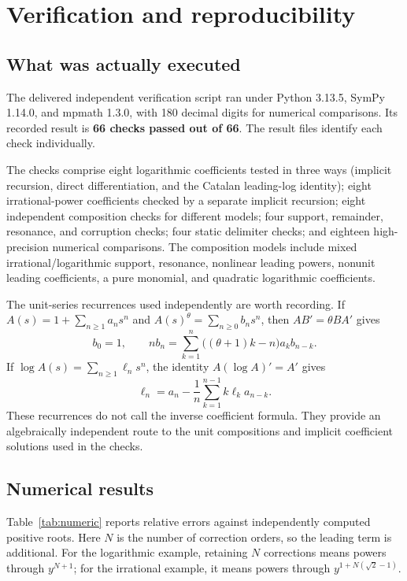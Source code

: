 \documentclass[11pt,a4paper]{article}
\numberwithin{equation}{section}
\theoremstyle{definition}
\begin{document}
\section{Verification and reproducibility}\label{sec:verification}

\subsection{What was actually executed}
The delivered independent verification script ran under Python 3.13.5,
SymPy 1.14.0, and mpmath 1.3.0, with 180 decimal digits for numerical
comparisons. Its recorded result is \textbf{66 checks passed out of 66}.
The result files identify each check individually.

The checks comprise eight logarithmic coefficients tested in three ways
(implicit recursion, direct differentiation, and the Catalan leading-log
identity); eight irrational-power coefficients checked by a separate
implicit recursion; eight independent composition checks for different
models; four support, remainder, resonance, and corruption checks; four
static delimiter checks; and eighteen high-precision numerical comparisons.
The composition models include mixed irrational/logarithmic support,
resonance, nonlinear leading powers, nonunit leading coefficients,
a pure monomial, and quadratic logarithmic coefficients.

The unit-series recurrences used independently are worth recording. If
$A(s)=1+\sum_{n\ge1}a_ns^n$ and $A(s)^\theta=\sum_{n\ge0}b_ns^n$, then
$A B'=\theta B A'$ gives
\begin{equation}\label{eq:unit-power-recurrence}
 b_0=1,\qquad
 nb_n=\sum_{k=1}^{n}\bigl((\theta+1)k-n\bigr)a_kb_{n-k}.
\end{equation}
If $\log A(s)=\sum_{n\ge1}\ell_ns^n$, the identity
$A(\log A)'=A'$ gives
\begin{equation}\label{eq:unit-log-recurrence}
 \ell_n=a_n-\frac1n\sum_{k=1}^{n-1}k\ell_k a_{n-k}.
\end{equation}
These recurrences do not call the inverse coefficient formula. They
provide an algebraically independent route to the unit compositions and
implicit coefficient solutions used in the checks.

\subsection{Numerical results}
Table~\ref{tab:numeric} reports relative errors against independently
computed positive roots. Here $N$ is the number of correction orders, so
the leading term is additional. For the logarithmic example, retaining
$N$ corrections means powers through $y^{N+1}$; for the irrational example,
it means powers through $y^{1+N(\sqrt2-1)}$.

\end{document}

